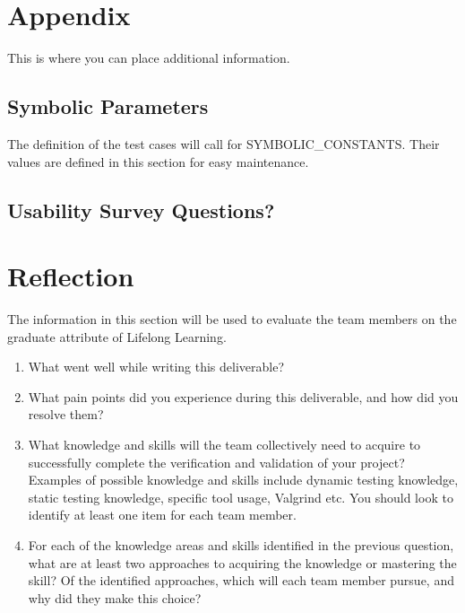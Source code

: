 \documentclass[12pt, titlepage]{article}
\begin{document}
\begin{appendices}

\section{Appendix}

This is where you can place additional information.

\subsection{Symbolic Parameters}

The definition of the test cases will call for SYMBOLIC\_CONSTANTS.
Their values are defined in this section for easy maintenance.

\subsection{Usability Survey Questions?}


\newpage{}
\section{Reflection}


The information in this section will be used to evaluate the team members on the
graduate attribute of Lifelong Learning.



\begin{enumerate}
  \item What went well while writing this deliverable? 
  \item What pain points did you experience during this deliverable, and how
    did you resolve them?
  \item What knowledge and skills will the team collectively need to acquire to
  successfully complete the verification and validation of your project?
  Examples of possible knowledge and skills include dynamic testing knowledge,
  static testing knowledge, specific tool usage, Valgrind etc.  You should look to
  identify at least one item for each team member.
  \item For each of the knowledge areas and skills identified in the previous
  question, what are at least two approaches to acquiring the knowledge or
  mastering the skill?  Of the identified approaches, which will each team
  member pursue, and why did they make this choice?
\end{enumerate}

\end{appendices}
\end{document}

